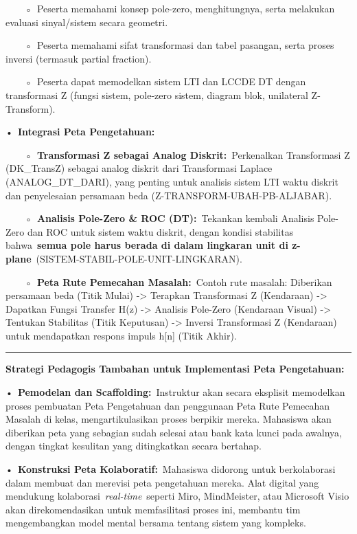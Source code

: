 \documentclass[
  letterpaper,
  DIV=11,
  numbers=noendperiod]{scrreprt}
\begin{document}
~~~~◦~Peserta memahami konsep pole-zero, menghitungnya, serta melakukan
evaluasi sinyal/sistem secara geometri.

~~~~◦~Peserta memahami sifat transformasi dan tabel pasangan, serta
proses inversi (termasuk partial fraction).

~~~~◦~Peserta dapat memodelkan sistem LTI dan LCCDE DT dengan
transformasi Z (fungsi sistem, pole-zero sistem, diagram blok,
unilateral Z-Transform).

•~\textbf{Integrasi Peta Pengetahuan:}

~~~~◦~\textbf{Transformasi Z sebagai Analog Diskrit:}~Perkenalkan
Transformasi Z (DK\_TransZ) sebagai analog diskrit dari Transformasi
Laplace (ANALOG\_DT\_DARI), yang penting untuk analisis sistem LTI waktu
diskrit dan penyelesaian persamaan beda (Z-TRANSFORM-UBAH-PB-ALJABAR).

~~~~◦~\textbf{Analisis Pole-Zero \& ROC (DT):}~Tekankan kembali Analisis
Pole-Zero dan ROC untuk sistem waktu diskrit, dengan kondisi stabilitas
bahwa~\textbf{semua pole harus berada di dalam lingkaran unit di
z-plane}~(SISTEM-STABIL-POLE-UNIT-LINGKARAN).

~~~~◦~\textbf{Peta Rute Pemecahan Masalah:}~Contoh rute masalah:
Diberikan persamaan beda (Titik Mulai) -\textgreater{} Terapkan
Transformasi Z (Kendaraan) -\textgreater{} Dapatkan Fungsi Transfer H(z)
-\textgreater{} Analisis Pole-Zero (Kendaraan Visual) -\textgreater{}
Tentukan Stabilitas (Titik Keputusan) -\textgreater{} Inversi
Transformasi Z (Kendaraan) untuk mendapatkan respons impuls h{[}n{]}
(Titik Akhir).

\begin{center}\rule{0.5\linewidth}{0.5pt}\end{center}

\textbf{Strategi Pedagogis Tambahan untuk Implementasi Peta
Pengetahuan:}

•~\textbf{Pemodelan dan Scaffolding:}~Instruktur akan secara eksplisit
memodelkan proses pembuatan Peta Pengetahuan dan penggunaan Peta Rute
Pemecahan Masalah di kelas, mengartikulasikan proses berpikir mereka.
Mahasiswa akan diberikan peta yang sebagian sudah selesai atau bank kata
kunci pada awalnya, dengan tingkat kesulitan yang ditingkatkan secara
bertahap.

•~\textbf{Konstruksi Peta Kolaboratif:}~Mahasiswa didorong untuk
berkolaborasi dalam membuat dan merevisi peta pengetahuan mereka. Alat
digital yang mendukung kolaborasi~\emph{real-time}~seperti Miro,
MindMeister, atau Microsoft Visio akan direkomendasikan untuk
memfasilitasi proses ini, membantu tim mengembangkan model mental
bersama tentang sistem yang kompleks.
\end{document}
